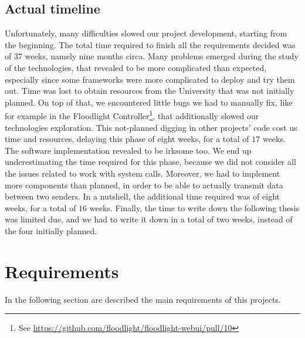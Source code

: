 \subsection{Actual timeline}
Unfortunately, many difficulties slowed our project development, starting from
the beginning. The total time required to finish all the requirements decided
was of $37$ weeks, namely nine months circa. Many problems emerged during the
study of the technologies, that revealed to be more complicated than expected,
especially since some frameworks were more complicated to deploy and try them
out. Time was lost to obtain resources from the University that was not
initially planned. On top of that, we encountered little bugs we had to manually
fix, like for example in the Floodlight Controller\footnote{See
  \url{https://github.com/floodlight/floodlight-webui/pull/10}}, that
additionally slowed our technologies exploration. This not-planned digging in
other projects' code cost us time and resources, delaying this phase of eight
weeks, for a total of $17$ weeks. The software implementation revealed to be
irksome too. We end up underestimating the time required for this phase, because
we did not consider all the issues related to work with system calls. Moreover,
we had to implement more components than planned, in order to be able to
actually transmit data between two senders. In a nutshell, the additional time
required was of eight weeks, for a total of $16$ weeks. Finally, the time to
write down the following thesis was limited due, and we had to write it down in
a total of two weeks, instead of the four initially planned.

\section{Requirements}\label{chap:prjan:sec:req}
In the following section are described the main requirements of this projects.

